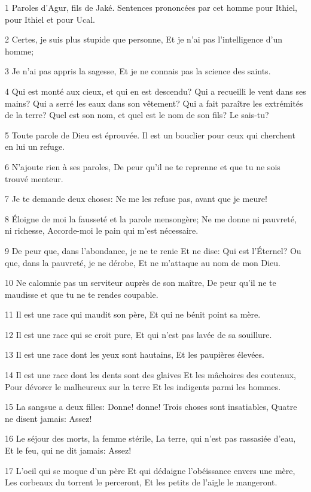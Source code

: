 \par 1 Paroles d'Agur, fils de Jaké. Sentences prononcées par cet homme pour Ithiel, pour Ithiel et pour Ucal.
\par 2 Certes, je suis plus stupide que personne, Et je n'ai pas l'intelligence d'un homme;
\par 3 Je n'ai pas appris la sagesse, Et je ne connais pas la science des saints.
\par 4 Qui est monté aux cieux, et qui en est descendu? Qui a recueilli le vent dans ses mains? Qui a serré les eaux dans son vêtement? Qui a fait paraître les extrémités de la terre? Quel est son nom, et quel est le nom de son fils? Le sais-tu?
\par 5 Toute parole de Dieu est éprouvée. Il est un bouclier pour ceux qui cherchent en lui un refuge.
\par 6 N'ajoute rien à ses paroles, De peur qu'il ne te reprenne et que tu ne sois trouvé menteur.
\par 7 Je te demande deux choses: Ne me les refuse pas, avant que je meure!
\par 8 Éloigne de moi la fausseté et la parole mensongère; Ne me donne ni pauvreté, ni richesse, Accorde-moi le pain qui m'est nécessaire.
\par 9 De peur que, dans l'abondance, je ne te renie Et ne dise: Qui est l'Éternel? Ou que, dans la pauvreté, je ne dérobe, Et ne m'attaque au nom de mon Dieu.
\par 10 Ne calomnie pas un serviteur auprès de son maître, De peur qu'il ne te maudisse et que tu ne te rendes coupable.
\par 11 Il est une race qui maudit son père, Et qui ne bénit point sa mère.
\par 12 Il est une race qui se croit pure, Et qui n'est pas lavée de sa souillure.
\par 13 Il est une race dont les yeux sont hautains, Et les paupières élevées.
\par 14 Il est une race dont les dents sont des glaives Et les mâchoires des couteaux, Pour dévorer le malheureux sur la terre Et les indigents parmi les hommes.
\par 15 La sangsue a deux filles: Donne! donne! Trois choses sont insatiables, Quatre ne disent jamais: Assez!
\par 16 Le séjour des morts, la femme stérile, La terre, qui n'est pas rassasiée d'eau, Et le feu, qui ne dit jamais: Assez!
\par 17 L'oeil qui se moque d'un père Et qui dédaigne l'obéissance envers une mère, Les corbeaux du torrent le perceront, Et les petits de l'aigle le mangeront.
